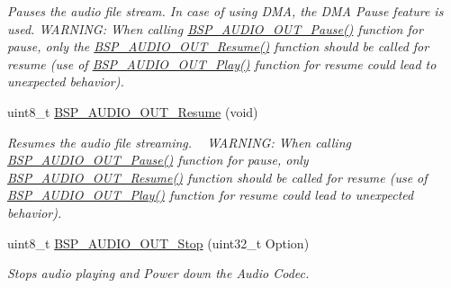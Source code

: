 \begin{DoxyCompactItemize}
\begin{DoxyCompactList}\small\item\em Pauses the audio file stream. In case of using D\+MA, the D\+MA Pause feature is used. W\+A\+R\+N\+I\+NG\+: When calling \mbox{\hyperlink{group___s_t_m32_f4___d_i_s_c_o_v_e_r_y___a_u_d_i_o___o_u_t___private___functions_ga73a0f92b8adbfb2e8207067434c2bfef}{B\+S\+P\+\_\+\+A\+U\+D\+I\+O\+\_\+\+O\+U\+T\+\_\+\+Pause()}} function for pause, only the \mbox{\hyperlink{group___s_t_m32_f4___d_i_s_c_o_v_e_r_y___a_u_d_i_o___o_u_t___private___functions_ga064f0eddd4ab25a33fd1fe83af429c9f}{B\+S\+P\+\_\+\+A\+U\+D\+I\+O\+\_\+\+O\+U\+T\+\_\+\+Resume()}} function should be called for resume (use of \mbox{\hyperlink{group___s_t_m32_f4___d_i_s_c_o_v_e_r_y___a_u_d_i_o___o_u_t___private___functions_gaa415fdd481a01468fdfcd9d91f0f6711}{B\+S\+P\+\_\+\+A\+U\+D\+I\+O\+\_\+\+O\+U\+T\+\_\+\+Play()}} function for resume could lead to unexpected behavior). \end{DoxyCompactList}\item 
uint8\+\_\+t \mbox{\hyperlink{group___s_t_m32_f4___d_i_s_c_o_v_e_r_y___a_u_d_i_o___o_u_t___exported___functions_ga064f0eddd4ab25a33fd1fe83af429c9f}{B\+S\+P\+\_\+\+A\+U\+D\+I\+O\+\_\+\+O\+U\+T\+\_\+\+Resume}} (void)
\begin{DoxyCompactList}\small\item\em Resumes the audio file streaming. ~\newline
W\+A\+R\+N\+I\+NG\+: When calling \mbox{\hyperlink{group___s_t_m32_f4___d_i_s_c_o_v_e_r_y___a_u_d_i_o___o_u_t___private___functions_ga73a0f92b8adbfb2e8207067434c2bfef}{B\+S\+P\+\_\+\+A\+U\+D\+I\+O\+\_\+\+O\+U\+T\+\_\+\+Pause()}} function for pause, only \mbox{\hyperlink{group___s_t_m32_f4___d_i_s_c_o_v_e_r_y___a_u_d_i_o___o_u_t___private___functions_ga064f0eddd4ab25a33fd1fe83af429c9f}{B\+S\+P\+\_\+\+A\+U\+D\+I\+O\+\_\+\+O\+U\+T\+\_\+\+Resume()}} function should be called for resume (use of \mbox{\hyperlink{group___s_t_m32_f4___d_i_s_c_o_v_e_r_y___a_u_d_i_o___o_u_t___private___functions_gaa415fdd481a01468fdfcd9d91f0f6711}{B\+S\+P\+\_\+\+A\+U\+D\+I\+O\+\_\+\+O\+U\+T\+\_\+\+Play()}} function for resume could lead to unexpected behavior). \end{DoxyCompactList}\item 
uint8\+\_\+t \mbox{\hyperlink{group___s_t_m32_f4___d_i_s_c_o_v_e_r_y___a_u_d_i_o___o_u_t___exported___functions_gad1a2df4f21ae348be27cecff63dfca1c}{B\+S\+P\+\_\+\+A\+U\+D\+I\+O\+\_\+\+O\+U\+T\+\_\+\+Stop}} (uint32\+\_\+t Option)
\begin{DoxyCompactList}\small\item\em Stops audio playing and Power down the Audio Codec. \end{DoxyCompactList}\item 

\end{DoxyCompactItemize}

